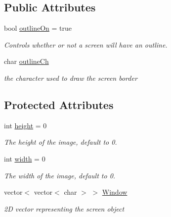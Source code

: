 \subsection*{Public Attributes}
\begin{DoxyCompactItemize}
\item 
bool \hyperlink{classScreen_a6f906b745f406576d9f7aeaec330c9d6}{outline\-On} = true
\begin{DoxyCompactList}\small\item\em Controls whether or not a screen will have an outline. \end{DoxyCompactList}\item 
char \hyperlink{classScreen_a0b59df2bfafff7a121286a5ea40503b6}{outline\-Ch}
\begin{DoxyCompactList}\small\item\em the character used to draw the screen border \end{DoxyCompactList}\end{DoxyCompactItemize}
\subsection*{Protected Attributes}
\begin{DoxyCompactItemize}
\item 
int \hyperlink{classScreen_a55405920693276db8fbdbf3a903b8d2f}{height} = 0
\begin{DoxyCompactList}\small\item\em The height of the image, default to 0. \end{DoxyCompactList}\item 
int \hyperlink{classScreen_a49be8f8ccf7ed7a3151a761495c0ce21}{width} = 0
\begin{DoxyCompactList}\small\item\em The width of the image, default to 0. \end{DoxyCompactList}\item 
vector$<$ vector$<$ char $>$ $>$ \hyperlink{classScreen_a7349f56b4976f03dc9977dc613a8bbab}{Window}
\begin{DoxyCompactList}\small\item\em 2\-D vector representing the screen object \end{DoxyCompactList}\end{DoxyCompactItemize}
